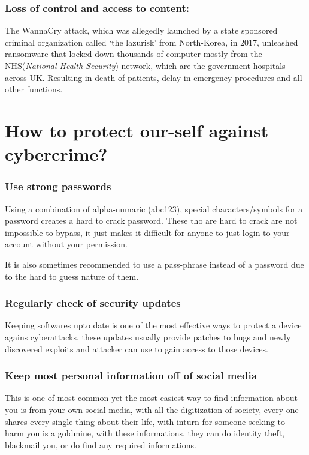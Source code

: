 \documentclass[twocolumn, 12pt, a4paper]{article}
\begin{document}
\subsubsection{Loss of control and access to content:}
The WannaCry attack, which was allegedly launched by a state sponsored
criminal organization called `the lazurisk' from North-Korea, in 2017,
unleashed ransomware that locked-down thousands of computer mostly from the
NHS(\emph{National Health Security}) network, which are the government
hospitals across UK. Resulting in death of patients, delay in emergency
procedures and all other functions.

\section{How to protect our-self against cybercrime?}
\subsubsection{Use strong passwords}
Using a combination of alpha-numaric (abc123), special characters/symbols for a
password creates a hard to crack password. These tho are hard to crack are not
impossible to bypass, it just makes it difficult for anyone to just login to
your account without your permission.

It is also sometimes recommended to use a pass-phrase instead of a password 
due to the hard to guess nature of them.

\subsubsection{Regularly check of security updates}
Keeping softwares upto date is one of the most effective ways to protect a
device agains cyberattacks, these updates usually provide patches to bugs and 
newly discovered exploits and attacker can use to gain access to those devices.

\subsubsection{Keep most personal information off of social media}
This is one of most common yet the most easiest way to find information about
you is from your own social media, with all the digitization of society, every
one shares every single thing about their life, with inturn for someone seeking
to harm you is a goldmine, with these informations, they can do identity theft,
blackmail you, or do find any required informations.
\end{document}
